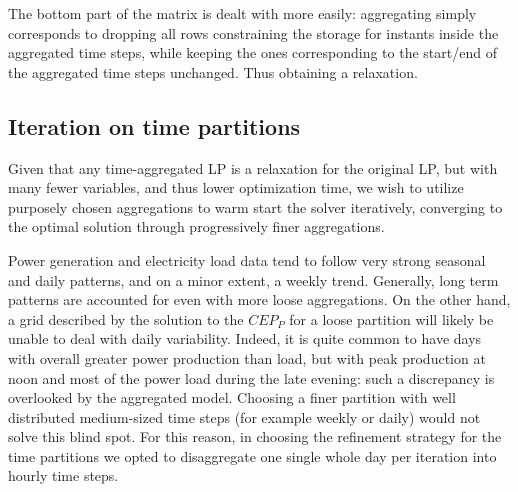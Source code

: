 \documentclass[smallextended,natbib]{svjour3}       %
\numberwithin{theorem}{section}
\begin{document}
The bottom part of the matrix is dealt with more easily: aggregating simply corresponds to dropping all rows constraining the storage for instants inside the aggregated time steps, while keeping the ones corresponding to the start/end of the aggregated time steps unchanged.
Thus obtaining a relaxation.














\subsection{Iteration on time partitions}\label{subsection: iter}

Given that any time-aggregated LP is a relaxation for the original LP, but with many fewer variables, and thus lower optimization time, we wish to utilize purposely chosen aggregations to warm start the solver iteratively, converging to the optimal solution through progressively finer aggregations.

Power generation and electricity load data tend to follow very strong seasonal and daily patterns, and on a minor extent, a weekly trend.
Generally, long term patterns are accounted for even with more loose aggregations. 
On the other hand, a grid described by the solution to the $CEP_{P}$ for a loose partition will likely be unable to deal with daily variability. 
Indeed, it is quite common to have days with overall greater power production than load, but with peak production at noon and most of the power load during the late evening: such a discrepancy is overlooked by the aggregated model. 
Choosing a finer partition with well distributed medium-sized time steps (for example weekly or daily) would not solve this blind spot. 
For this reason, in choosing the refinement strategy for the time partitions we opted to disaggregate one single whole day per iteration into hourly time steps.
\end{document}
